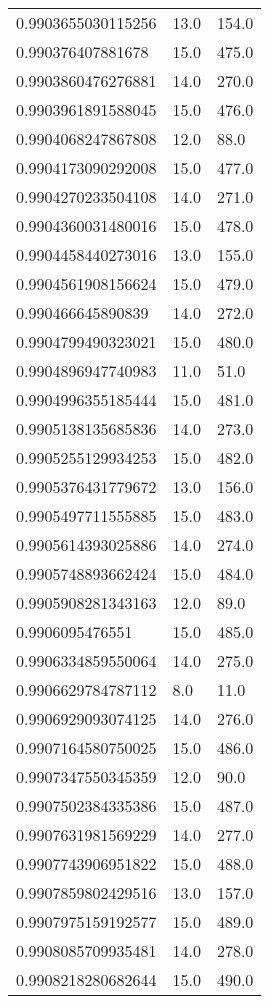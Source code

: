 \begin{center}
\begin{supertabular}[H]{p{0.30\textwidth}p{0.05\textwidth}p{0.05\textwidth}}
0.9903655030115256 & 13.0 & 154.0 \\ 
0.990376407881678 & 15.0 & 475.0 \\ 
0.9903860476276881 & 14.0 & 270.0 \\ 
0.9903961891588045 & 15.0 & 476.0 \\ 
0.9904068247867808 & 12.0 & 88.0 \\ 
0.9904173090292008 & 15.0 & 477.0 \\ 
0.9904270233504108 & 14.0 & 271.0 \\ 
0.9904360031480016 & 15.0 & 478.0 \\ 
0.9904458440273016 & 13.0 & 155.0 \\ 
0.9904561908156624 & 15.0 & 479.0 \\ 
0.990466645890839 & 14.0 & 272.0 \\ 
0.9904799490323021 & 15.0 & 480.0 \\ 
0.9904896947740983 & 11.0 & 51.0 \\ 
0.9904996355185444 & 15.0 & 481.0 \\ 
0.9905138135685836 & 14.0 & 273.0 \\ 
0.9905255129934253 & 15.0 & 482.0 \\ 
0.9905376431779672 & 13.0 & 156.0 \\ 
0.9905497711555885 & 15.0 & 483.0 \\ 
0.9905614393025886 & 14.0 & 274.0 \\ 
0.9905748893662424 & 15.0 & 484.0 \\ 
0.9905908281343163 & 12.0 & 89.0 \\ 
0.9906095476551 & 15.0 & 485.0 \\ 
0.9906334859550064 & 14.0 & 275.0 \\ 
0.9906629784787112 & 8.0 & 11.0 \\ 
0.9906929093074125 & 14.0 & 276.0 \\ 
0.9907164580750025 & 15.0 & 486.0 \\ 
0.9907347550345359 & 12.0 & 90.0 \\ 
0.9907502384335386 & 15.0 & 487.0 \\ 
0.9907631981569229 & 14.0 & 277.0 \\ 
0.9907743906951822 & 15.0 & 488.0 \\ 
0.9907859802429516 & 13.0 & 157.0 \\ 
0.9907975159192577 & 15.0 & 489.0 \\ 
0.9908085709935481 & 14.0 & 278.0 \\ 
0.9908218280682644 & 15.0 & 490.0 \\ 

\end{supertabular}
\end{center}
